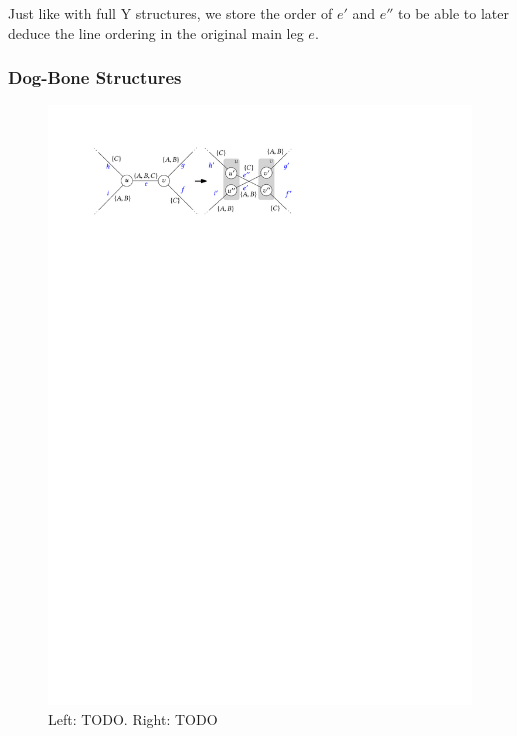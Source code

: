 \documentclass[format=acmsmall, review=false, screen=true]{acmart}
\begin{document}
Just like with full Y structures, we store the order of $e'$ and $e''$ to be able to later deduce the line ordering in the original main leg $e$.

\subsubsection{Dog-Bone Structures}\label{SEC:dogbone}

\begin{figure}
\centering
  \includegraphics[width=.7\textwidth, page=1]{untangling/dogbone.pdf}
  \caption{Left: TODO. Right: TODO}  
  \label{FIG:untangle_dogbone}

\end{figure}
\end{document}
